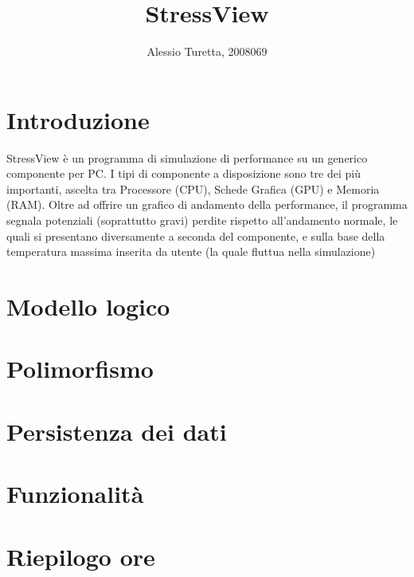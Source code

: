 \documentclass[10pt]{article}
\title{StressView}
\author{Alessio Turetta, 2008069}
\date{}
\begin{document}
\maketitle
\tableofcontents
\newpage

\section{Introduzione}
StressView è un programma di simulazione di performance su un generico componente
per PC.
I tipi di componente a disposizione sono tre dei più importanti, ascelta tra
Processore (CPU), Schede Grafica (GPU) e Memoria (RAM).
Oltre ad offrire un grafico di andamento della performance, il programma segnala
potenziali (soprattutto gravi) perdite rispetto all'andamento normale,
le quali si presentano diversamente a seconda del componente,
e sulla base della temperatura massima inserita da utente (la quale fluttua
nella simulazione)

\section{Modello logico}
\section{Polimorfismo}
\section{Persistenza dei dati}
\section{Funzionalità}
\section{Riepilogo ore}
\end{document}
